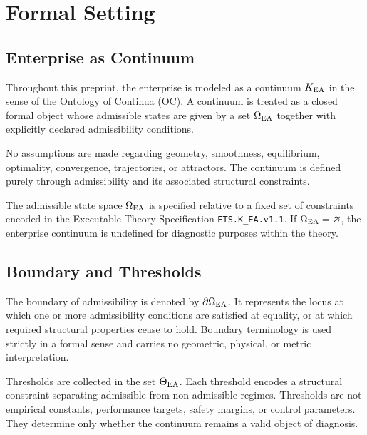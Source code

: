 ﻿%

\section{Formal Setting}

\subsection{Enterprise as Continuum}

Throughout this preprint, the enterprise is modeled as a continuum
$K_{\mathrm{EA}}$ in the sense of the Ontology of Continua (OC). A continuum is
treated as a closed formal object whose admissible states are given by a
set $\Omega_{\mathrm{EA}}$ together with explicitly declared admissibility
conditions.

No assumptions are made regarding geometry, smoothness, equilibrium,
optimality, convergence, trajectories, or attractors. The continuum is
defined purely through admissibility and its associated structural
constraints.

The admissible state space $\Omega_{\mathrm{EA}}$ is specified relative to a fixed
set of constraints encoded in the Executable Theory Specification
\texttt{ETS.K\_EA.v1.1}. If $\Omega_{\mathrm{EA}} = \varnothing$, the enterprise
continuum is undefined for diagnostic purposes within the theory.

\subsection{Boundary and Thresholds}

The boundary of admissibility is denoted by $\partial\Omega_{\mathrm{EA}}$. It represents
the locus at which one or more admissibility conditions are satisfied at
equality, or at which required structural properties cease to hold.
Boundary terminology is used strictly in a formal sense and carries no
geometric, physical, or metric interpretation.

Thresholds are collected in the set $\Theta_{\mathrm{EA}}$. Each threshold encodes a
structural constraint separating admissible from non-admissible
regimes. Thresholds are not empirical constants, performance targets,
safety margins, or control parameters. They determine only whether the
continuum remains a valid object of diagnosis.

